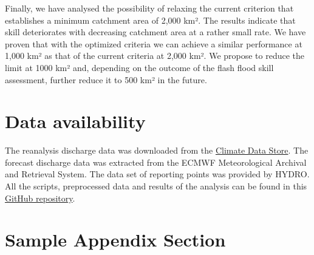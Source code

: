 \documentclass[preprint,12pt]{elsarticle}
\begin{document}
Finally, we have analysed the possibility of relaxing the current criterion that establishes a minimum catchment area of 2,000 km². The results indicate that skill deteriorates with decreasing catchment area at a rather small rate. We have proven that with the optimized criteria we can achieve a similar performance at 1,000 km² as that of the current criteria at 2,000 km². We propose to reduce the limit at 1000 km² and, depending on the outcome of the flash flood skill assessment, further reduce it to 500 km² in the future.

\section{Data availability}

The reanalysis discharge data was downloaded from the \href{https://cds.climate.copernicus.eu}{Climate Data Store}. The forecast discharge data was extracted from the ECMWF Meteorological Archival and Retrieval System. The data set of reporting points was provided by HYDRO. All the scripts, preprocessed data and results of the analysis can be found in this \href{https://github.com/casadoj/EFAS_skill}{GitHub repository}.

\appendix

\section{Sample Appendix Section}
\label{sec:sample:appendix}


  
 





\end{document}

